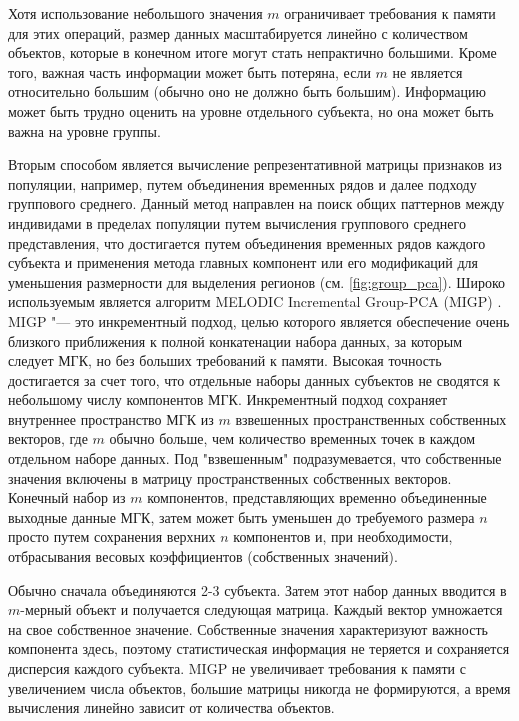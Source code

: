 Хотя использование небольшого значения $m$ ограничивает требования к памяти для этих операций, размер данных 
масштабируется линейно с количеством объектов, которые в конечном итоге могут стать непрактично большими. 
Кроме того, важная часть информации может быть потеряна, если $m$ не является относительно большим (обычно оно 
не должно быть большим). Информацию может быть трудно оценить на уровне отдельного субъекта, но она может быть 
важна на уровне группы. 

Вторым способом является вычисление репрезентативной матрицы признаков из популяции, например, путем объединения 
временных рядов и далее подходу группового среднего. Данный метод направлен на поиск общих паттернов между 
индивидами в пределах популяции путем вычисления группового среднего представления, что достигается путем объединения 
временных рядов каждого субъекта и применения метода главных компонент или его модификаций для уменьшения 
размерности для выделения регионов (см. \cref{fig:group_pca}). Широко используемым является алгоритм MELODIC 
Incremental Group-PCA (MIGP) \cite{rachakonda2016memory} . MIGP "--- это инкрементный подход, целью которого 
является обеспечение очень близкого приближения к полной конкатенации набора данных, за которым следует МГК, 
но без больших требований к памяти. Высокая точность достигается за счет того, что отдельные наборы данных 
субъектов не сводятся к небольшому числу компонентов МГК. Инкрементный подход сохраняет внутреннее пространство 
МГК из $m$ взвешенных пространственных собственных векторов, где $m$ обычно больше, чем количество временных 
точек в каждом отдельном наборе данных. Под "взвешенным" подразумевается, что собственные значения включены в 
матрицу пространственных собственных векторов. Конечный набор из $m$ компонентов, представляющих временно 
объединенные выходные данные МГК, затем может быть уменьшен до требуемого размера $n$ просто путем сохранения 
верхних $n$ компонентов и, при необходимости, отбрасывания весовых коэффициентов (собственных значений).

Обычно сначала объединяются 2-3 субъекта. Затем этот набор данных вводится в $m$-мерный объект и получается 
следующая матрица. Каждый вектор умножается на свое собственное значение. Собственные значения характеризуют 
важность компонента здесь, поэтому статистическая информация не теряется и сохраняется дисперсия каждого субъекта. 
MIGP не увеличивает требования к памяти с увеличением числа объектов, большие матрицы никогда не формируются, 
а время вычисления линейно зависит от количества объектов.

